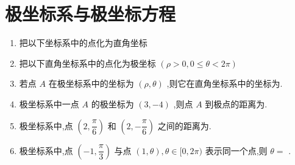 \section*{极坐标系与极坐标方程}
\begin{enumerate}
    \item 把以下坐标系中的点化为直角坐标
    
    
    \item 把以下直角坐标系中的点化为极坐标 $\left( {\rho  > 0,0 \leq  \theta  < {2\pi }}\right)$
    
    
    \item 若点 ${A}$ 在极坐标系中的坐标为 $\left( {\rho ,\theta }\right)$ ,则它在直角坐标系中的坐标为.

    \item 极坐标系中一点 $A$ 的极坐标为 $\left( {3, - 4}\right)$ ,则点 $A$ 到极点的距离为.

    \item 极坐标系中,点 $\left( {2,\dfrac{\pi }{6}}\right)$ 和 $\left( {2, - \dfrac{\pi }{6}}\right)$ 之间的距离为.

    \item 极坐标系中,点 $\left( {-1,\dfrac{\pi }{3}}\right)$ 与点 $\left( {1,\theta }\right) ,\theta  \in  \lbrack 0,{2\pi })$ 表示同一个点,则 $\theta  =$ .


\end{enumerate}
